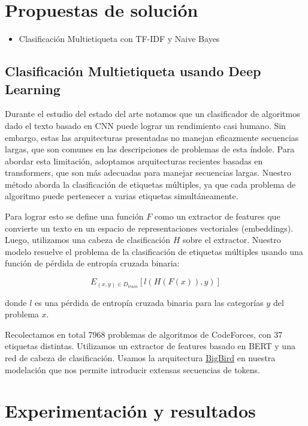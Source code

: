 \documentclass{article}
\begin{document}
\section{Propuestas de solución}
\begin{itemize}
    \item Clasificación Multietiqueta con TF-IDF y Naive Bayes
\end{itemize}

    \subsection{Clasificación Multietiqueta usando Deep Learning}

    Durante el estudio del estado del arte notamos que un clasificador de algoritmos dado el texto 
    basado en CNN puede lograr un rendimiento casi humano. Sin embargo, estas las arquitecturas 
    presentadas no manejan eficazmente secuencias largas, que son comunes en las descripciones de 
    problemas de esta índole. Para abordar esta limitación, adoptamos arquitecturas recientes 
    basadas en transformers, que son más adecuadas para manejar secuencias largas. Nuestro método 
    aborda la clasificación de etiquetas múltiples, ya que cada problema de algoritmo puede 
    pertenecer a varias etiquetas simultáneamente.

    Para lograr esto se define una función $F$ como un extractor de features que convierte un 
    texto en un espacio de representaciones vectoriales (embeddings). Luego, utilizamos una cabeza 
    de clasificación $H$ sobre el extractor. Nuestro modelo resuelve el problema de la 
    clasificación de etiquetas múltiples usando una función de pérdida de entropía cruzada binaria:

    $$
        E_{(x, y) \in D_{train}} [ l(H(F(x)), y) ]
    $$

    donde $l$ es una pérdida de entropía cruzada binaria para las categorías $y$ del problema $x$.

    Recolectamos en total 7968 problemas de algoritmos de CodeForces, con 37 etiquetas distintas. 
    Utilizamos un extractor de features basado en BERT y una red de cabeza de 
    clasificación. Usamos la arquitectura \href{https://huggingface.co/google/bigbird-roberta-base}{BigBird} 
    en nuestra modelación que nos permite introducir extensas secuencias de tokens.

\section{Experimentación y resultados}
\end{document}
